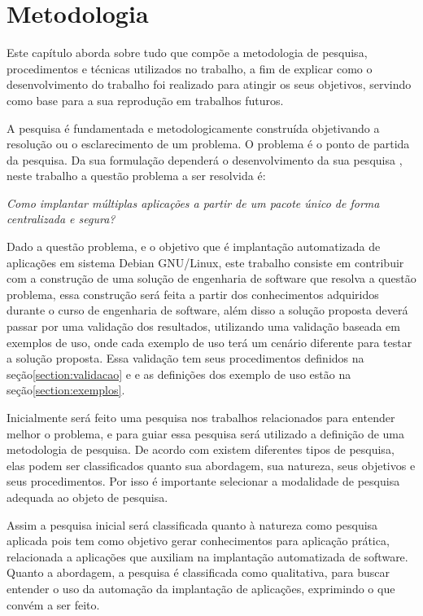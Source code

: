\chapter{Metodologia}
\label{cap-metodologia}
Este capítulo aborda sobre tudo que compõe a metodologia de pesquisa,
procedimentos e técnicas utilizados no trabalho, a fim de
explicar como o desenvolvimento do trabalho foi realizado para atingir os seus objetivos,
servindo como base para a sua reprodução em trabalhos futuros.

A pesquisa é fundamentada e metodologicamente construída objetivando a resolução
ou o esclarecimento de um problema. O problema é o ponto de partida da pesquisa.
Da sua formulação dependerá o desenvolvimento da sua pesquisa
\cite{moresi2003metodologia}, neste trabalho a questão problema a ser resolvida é:

\begin{center}
  \textit{
  Como implantar múltiplas aplicações a partir de um pacote único
  de forma centralizada e segura?
}
\end{center}

Dado a questão problema, e o objetivo que é implantação automatizada
de aplicações em sistema Debian GNU/Linux, este trabalho consiste em contribuir
com a construção de uma solução de engenharia de software que resolva a questão
problema, essa construção será feita a partir dos conhecimentos adquiridos durante
o curso de engenharia de software, além disso a solução proposta deverá passar
por uma validação dos resultados, utilizando uma validação baseada em exemplos
de uso, onde cada exemplo de uso terá um cenário diferente para testar a solução
proposta. Essa validação tem seus procedimentos definidos na seção\ref{section:validacao} e
e as definições dos exemplo de uso estão na seção\ref{section:exemplos}.

Inicialmente será feito uma pesquisa nos trabalhos relacionados para entender
melhor o problema, e para guiar essa pesquisa será utilizado a definição de uma
metodologia de pesquisa. De acordo com\cite{gerhardt2009metodos} existem diferentes
tipos de pesquisa, elas podem ser classificados quanto sua abordagem, sua natureza,
seus objetivos e seus procedimentos. Por isso é importante selecionar a modalidade
de pesquisa adequada ao objeto de pesquisa.

Assim a pesquisa inicial será classificada quanto à natureza como pesquisa aplicada
pois tem como objetivo gerar conhecimentos para aplicação prática\cite{gerhardt2009metodos},
relacionada a aplicações que auxiliam na implantação automatizada de software.
Quanto a abordagem, a pesquisa é classificada como qualitativa, para buscar entender
o uso da automação da implantação de aplicações, exprimindo o que convém
a ser feito.

